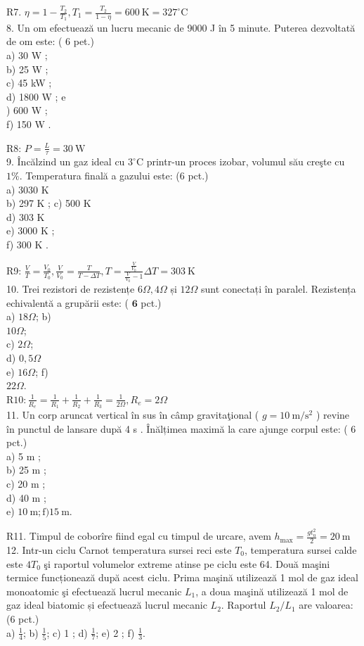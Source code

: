 R7. $\eta=1-\frac{T_{2}}{T_{1}}, T_{1}=\frac{T_{2}}{1-\eta}=600 \mathrm{~K}=327^{\circ} \mathrm{C}$\\
8. Un om efectuează un lucru mecanic de 9000 J în 5 minute. Puterea dezvoltată de om este: ( 6 pet.)\\
a) 30 W ;\\
b) 25 W ;\\
c) 45 kW ;\\
d) 1800 W ; e\\
) 600 W ;\\
f) 150 W .

R8: $P=\frac{L}{\tau}=30 \mathrm{~W}$\\
9. Încălzind un gaz ideal cu $3^{\circ} \mathrm{C}$ printr-un proces izobar, volumul său creşte cu $1 \%$. Temperatura finală a gazului este: (6 pct.)\\
a) 3030 K\\
b) 297 K ; c) 500 K\\
d) 303 K\\
e) 3000 K ;\\
f) 300 K .

R9: $\frac{V}{T}=\frac{V_{0}}{T_{0}}, \frac{V}{V_{0}}=\frac{T}{T-\Delta T}, T=\frac{\frac{V}{V_{0}}}{\frac{V}{V_{0}}-1} \Delta T=303 \mathrm{~K}$\\
10. Trei rezistori de rezistențe $6 \Omega, 4 \Omega$ și $12 \Omega$ sunt conectați în paralel. Rezistența echivalentă a grupării este: ( $\mathbf{6}$ pct.)\\
a) $18 \Omega$; b)\\
$10 \Omega$;\\
c) $2 \Omega$;\\
d) $0,5 \Omega$\\
e) $16 \Omega$; f)\\
$22 \Omega$.\\
$\mathrm{R} 10: \frac{1}{R_{e}}=\frac{1}{R_{1}}+\frac{1}{R_{2}}+\frac{1}{R_{3}}=\frac{1}{2 \Omega}, R_{e}=2 \Omega$\\
11. Un corp aruncat vertical în sus în câmp gravitaţional ( $g=10 \mathrm{~m} / \mathrm{s}^{2}$ ) revine în punctul de lansare după 4 s . Înălțimea maximă la care ajunge corpul este: ( 6 pct.)\\
a) 5 m ;\\
b) 25 m ;\\
c) 20 m ;\\
d) 40 m ;\\
e) $10 \mathrm{~m} ; \mathrm{f}) 15 \mathrm{~m}$.

R11. Timpul de coborîre fiind egal cu timpul de urcare, avem $h_{\max }=\frac{g t_{u}^{2}}{2}=20 \mathrm{~m}$\\
12. Intr-un ciclu Carnot temperatura sursei reci este $T_{0}$, temperatura sursei calde este $4 T_{0}$ şi raportul volumelor extreme atinse pe ciclu este 64. Două maşini termice funcționează după acest ciclu. Prima maşină utilizează 1 mol de gaz ideal monoatomic şi efectuează lucrul mecanic $L_{1}$, a doua maşină utilizează 1 mol de gaz ideal biatomic și efectuează lucrul mecanic $L_{2}$. Raportul $L_{2} / L_{1}$ are valoarea: (6 pct.)\\
a) $\frac{1}{4}$; b) $\frac{1}{5}$; c) 1 ; d) $\frac{1}{7}$; e) 2 ; f) $\frac{1}{3}$.

